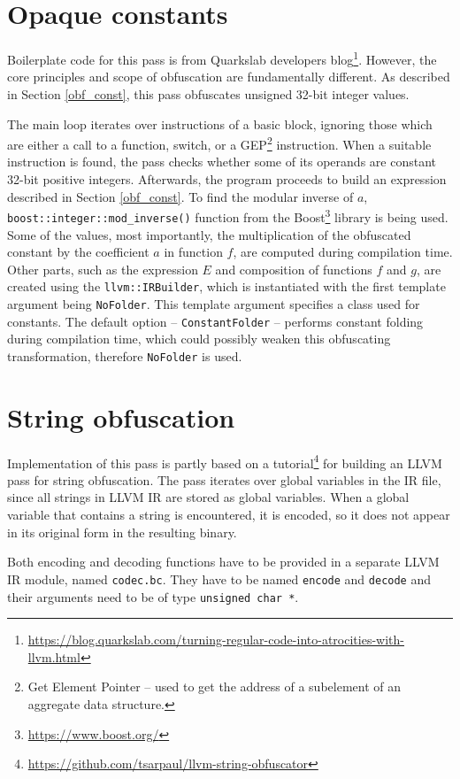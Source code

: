 \documentclass[
  digital, %
  notable,   %
  twoside, %
  nolof,     %
  nolot,     %
]{fithesis3}
\theoremstyle{definition}
\begin{document}
\section{Opaque constants}
Boilerplate code for this pass is from Quarkslab developers blog\footnote{\url{https://blog.quarkslab.com/turning-regular-code-into-atrocities-with-llvm.html}}. However, the core principles and scope of obfuscation are fundamentally different. As described in Section \ref{obf_const}, this pass obfuscates unsigned 32-bit integer values. 

The main loop iterates over instructions of a basic block, ignoring those which are either a call to a function, switch, or a GEP\footnote{Get Element Pointer -- used to get the address of a subelement of an aggregate data structure.} instruction. When a suitable instruction is found, the pass checks whether some of its operands are constant 32-bit positive integers. Afterwards, the program proceeds to build an expression described in Section \ref{obf_const}. To find the modular inverse of $a$, \texttt{boost::integer::mod\_inverse()} function from the Boost\footnote{\url{https://www.boost.org/}} library is being used. Some of the values, most importantly, the multiplication of the obfuscated constant by the coefficient $a$ in function $f$, are computed during compilation time. Other parts, such as the expression $E$ and composition of functions $f$ and $g$, are created using the \texttt{llvm::IRBuilder}, which is instantiated with the first template argument being \texttt{NoFolder}. This template argument specifies a class used for constants. The default option -- \texttt{ConstantFolder} -- performs constant folding during compilation time, which could possibly weaken this obfuscating transformation, therefore \texttt{NoFolder} is used. 



\section{String obfuscation}
Implementation of this pass is partly based on a tutorial\footnote{\url{https://github.com/tsarpaul/llvm-string-obfuscator}} for building an LLVM pass for string obfuscation. The pass iterates over global variables in the IR file, since all strings in LLVM IR are stored as global variables. When a global variable that contains a string is encountered, it is encoded, so it does not appear in its original form in the resulting binary. 

Both encoding and decoding functions have to be provided in a separate LLVM IR module, named \texttt{codec.bc}. They have to be named \texttt{encode} and \texttt{decode} and their arguments need to be of type \texttt{unsigned char *}. 
\end{document}
